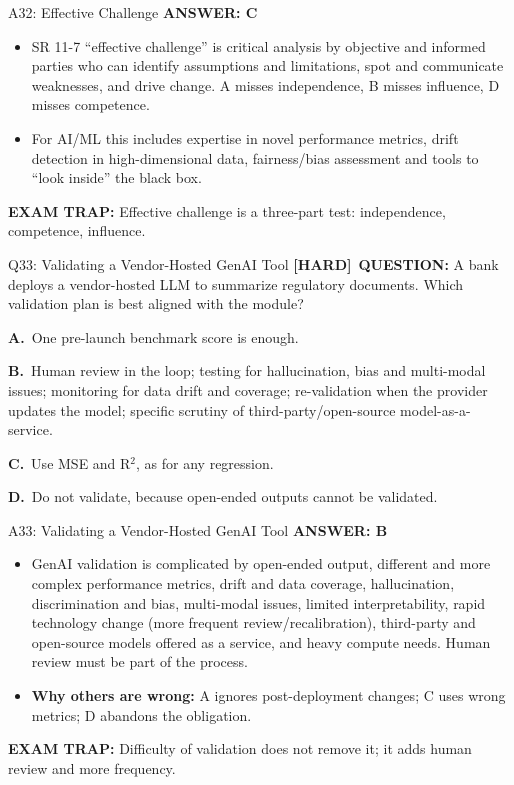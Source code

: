 \documentclass[8pt]{beamer}
\newcommand{\fs}{\fontsize{10}{12}\selectfont}
\newcommand{\opts}[4]{\par\vspace{0.12cm}\noindent\textbf{A.}~#1\par\vspace{0.08cm}\noindent\textbf{B.}~#2\par\vspace{0.08cm}\noindent\textbf{C.}~#3\par\vspace{0.08cm}\noindent\textbf{D.}~#4\par}
\newcommand{\ans}[1]{\textcolor{myblue}{\textbf{ANSWER: #1}}}
\newcommand{\trap}[1]{\textcolor{myred}{\textbf{EXAM TRAP:}} #1}
\newcommand{\hard}{\textcolor{myorange}{\textbf{[HARD]}}}
\begin{document}
\begin{frame}[t]{A32: Effective Challenge}
\fs
\ans{C}
\begin{itemize}
\item SR 11-7 ``effective challenge'' is critical analysis by objective and informed parties who can identify assumptions and limitations, spot and communicate weaknesses, and drive change. A misses independence, B misses influence, D misses competence.
\item For AI/ML this includes expertise in novel performance metrics, drift detection in high-dimensional data, fairness/bias assessment and tools to ``look inside'' the black box.
\end{itemize}
\trap{Effective challenge is a \textcolor{myblue}{three-part test}: independence, competence, influence.}
\end{frame}

\begin{frame}[t]{Q33: Validating a Vendor-Hosted GenAI Tool}
\fs
\hard\ \textbf{QUESTION:} A bank deploys a vendor-hosted LLM to summarize regulatory documents. Which validation plan is best aligned with the module?
\opts{One pre-launch benchmark score is enough.}
{Human review in the loop; testing for hallucination, bias and multi-modal issues; monitoring for data drift and coverage; re-validation when the provider updates the model; specific scrutiny of third-party/open-source model-as-a-service.}
{Use MSE and R$^2$, as for any regression.}
{Do not validate, because open-ended outputs cannot be validated.}
\end{frame}

\begin{frame}[t]{A33: Validating a Vendor-Hosted GenAI Tool}
\fs
\ans{B}
\begin{itemize}
\item GenAI validation is complicated by open-ended output, different and more complex performance metrics, drift and data coverage, hallucination, discrimination and bias, multi-modal issues, limited interpretability, rapid technology change (more frequent review/recalibration), third-party and open-source models offered as a service, and heavy compute needs. Human review must be part of the process.
\item \textbf{Why others are wrong:} A ignores post-deployment changes; C uses wrong metrics; D abandons the obligation.
\end{itemize}
\trap{Difficulty of validation does not remove it; it \textcolor{myblue}{adds human review and more frequency}.}
\end{frame}
\end{document}
